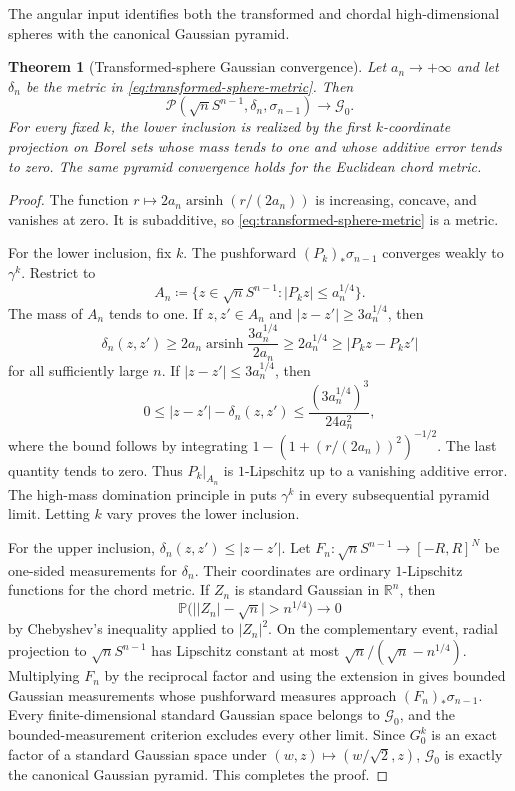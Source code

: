 \documentclass[10pt,a4paper]{amsart}
\numberwithin{equation}{section}
\newtheorem{theorem}{Theorem}[section]
\newcommand{\R}{\mathbb R}
\newcommand{\Pyr}{\mathcal P}
\DeclareMathOperator{\arsinh}{arsinh}
\begin{document}
The angular input identifies both the transformed and chordal high-dimensional spheres with the canonical Gaussian pyramid.

\begin{theorem}[Transformed-sphere Gaussian convergence]\label{thm:transformed-sphere-gaussian}
Let $a_n\to+\infty$ and let $\delta_n$ be the metric in \eqref{eq:transformed-sphere-metric}.  Then
\[ \Pyr(\sqrt nS^{n-1},\delta_n,\sigma_{n-1}) \longrightarrow\mathcal G_0. \]
For every fixed $k$, the lower inclusion is realized by the first $k$-coordinate projection on Borel sets whose mass tends to one and whose additive error tends to zero.  The same pyramid convergence holds for the Euclidean chord metric.
\end{theorem}

\begin{proof}
The function $r\mapsto2a_n\arsinh(r/(2a_n))$ is increasing, concave, and vanishes at zero.  It is subadditive, so \eqref{eq:transformed-sphere-metric} is a metric.

For the lower inclusion, fix $k$.  The pushforward $(P_k)_*\sigma_{n-1}$ converges weakly to $\gamma^k$.  Restrict to
\[ A_n\coloneqq\{z\in\sqrt nS^{n-1}\colon|P_kz|\le a_n^{1/4}\}. \]
The mass of $A_n$ tends to one.  If $z,z'\in A_n$ and $|z-z'|\ge3a_n^{1/4}$, then
\[ \delta_n(z,z') \ge2a_n\arsinh\frac{3a_n^{1/4}}{2a_n} \ge2a_n^{1/4} \ge|P_kz-P_kz'| \]
for all sufficiently large $n$.  If $|z-z'|\le3a_n^{1/4}$, then
\[ 0\le |z-z'|-\delta_n(z,z') \le\frac{(3a_n^{1/4})^3}{24a_n^2}, \]
where the bound follows by integrating $1-(1+(r/(2a_n))^2)^{-1/2}$.  The last quantity tends to zero.  Thus $P_k|_{A_n}$ is $1$-Lipschitz up to a vanishing additive error.  The high-mass domination principle in  puts $\gamma^k$ in every subsequential pyramid limit.  Letting $k$ vary proves the lower inclusion.

For the upper inclusion, $\delta_n(z,z')\le|z-z'|$.  Let $F_n\colon\sqrt nS^{n-1}\to[-R,R]^N$ be one-sided measurements for $\delta_n$.  Their coordinates are ordinary $1$-Lipschitz functions for the chord metric.  If $Z_n$ is standard Gaussian in $\R^n$, then
\[ \mathbb P\bigl(\bigl||Z_n|-\sqrt n\bigr|>n^{1/4}\bigr)\longrightarrow0 \]
by Chebyshev's inequality applied to $|Z_n|^2$.  On the complementary event, radial projection to $\sqrt nS^{n-1}$ has Lipschitz constant at most $\sqrt n/(\sqrt n-n^{1/4})$.  Multiplying $F_n$ by the reciprocal factor and using the extension in  gives bounded Gaussian measurements whose pushforward measures approach $(F_n)_*\sigma_{n-1}$.  Every finite-dimensional standard Gaussian space belongs to $\mathcal G_0$, and the bounded-measurement criterion excludes every other limit.  Since $G_0^k$ is an exact factor of a standard Gaussian space under $(w,z)\mapsto(w/\sqrt2,z)$, $\mathcal G_0$ is exactly the canonical Gaussian pyramid.  This completes the proof.
\end{proof}
\end{document}

